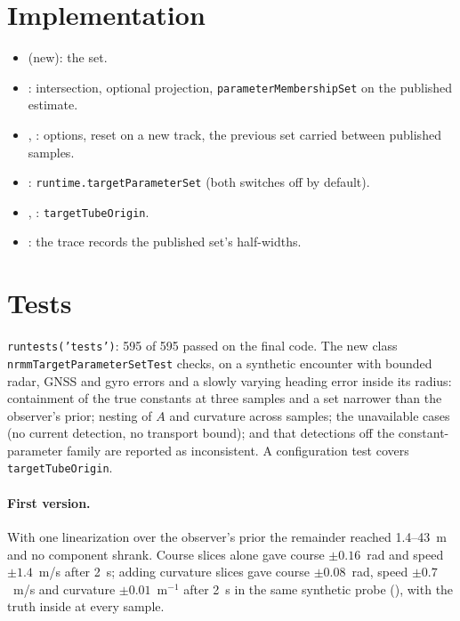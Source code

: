 \documentclass[11pt]{article}
\begin{document}
\section{Implementation}
\begin{itemize}
\item {} (new): the set.
\item {}: intersection, optional
  projection, \texttt{parameterMembershipSet} on the published estimate.
\item {},
  : options, reset on a new track,
  the previous set carried between published samples.
\item {}:
  \texttt{runtime.targetParameterSet} (both switches off by default).
\item {},
  : \texttt{targetTubeOrigin}.
\item {}: the trace
  records the published set's half-widths.
\end{itemize}

\section{Tests}
\texttt{runtests('tests')}: 595 of 595 passed on the final code. The new class
\texttt{nrmmTargetParameterSetTest} checks, on a synthetic encounter with
bounded radar, GNSS and gyro errors and a slowly varying heading error inside
its radius: containment of the true constants at three samples and a set
narrower than the observer's prior; nesting of $A$ and curvature across
samples; the unavailable cases (no current detection, no transport bound);
and that detections off the constant-parameter family are reported as
inconsistent. A configuration test covers \texttt{targetTubeOrigin}.

\paragraph{First version.} With one linearization over the observer's prior
the remainder reached 1.4--43~m and no component shrank. Course slices alone
gave course $\pm0.16$~rad and speed $\pm1.4$~m/s after 2~s; adding curvature
slices gave course $\pm0.08$~rad, speed $\pm0.7$~m/s and curvature
$\pm0.01$~m$^{-1}$ after 2~s in the same synthetic probe
(), with the truth inside at every sample.
\end{document}

